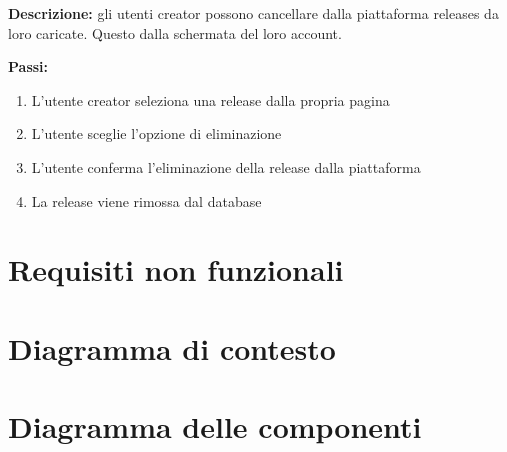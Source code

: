 \documentclass[a4paper,12pt]{article}
\begin{document}
\textbf{Descrizione:} gli utenti creator possono cancellare dalla piattaforma releases da loro caricate. Questo dalla schermata del loro account.

\textbf{Passi:}
\begin{enumerate}
    \item L’utente creator seleziona una release dalla propria pagina
    \item L'utente sceglie l’opzione di eliminazione
    \item L'utente conferma l’eliminazione della release dalla piattaforma
    \item La release viene rimossa dal database    
\end{enumerate}

\newpage
\section{Requisiti non funzionali}


\newpage
\section{Diagramma di contesto}

\newpage
\section{Diagramma delle componenti}
\end{document}
